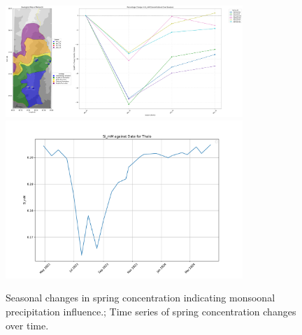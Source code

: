 \begin{figure}[h]
    \centering
    \includegraphics[width=0.8\textwidth]{Si_mM_percentage_change_springs.pdf}
    \includegraphics[width=0.8\textwidth]{Si_mM_Thalo_timeseries.pdf}
    \caption{Seasonal changes in spring concentration indicating monsoonal precipitation influence.; Time series of spring concentration changes over time.}
    \label{fig:time_series_changes}
\end{figure}

\FloatBarrier
